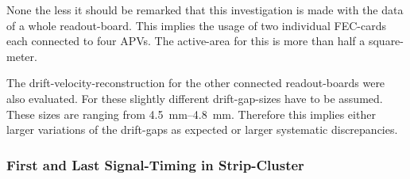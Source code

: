 \documentclass[
twoside,            %
BCOR1.4cm,          %
10pt,               %
headings=normal,    %
headsepline,        %
clearplainpage,		%
final,              %
div=14,
open=right,
bibliography=toc
]{scrreprt}
\begin{document}
None the less it should be remarked that this investigation is made with the data of a whole readout-board.
This implies the usage of two individual FEC-cards each connected to four APVs.
The active-area for this is more than half a square-meter. 

The drift-velocity-reconstruction for the other connected readout-boards were also evaluated.
For these slightly different drift-gap-sizes have to be assumed.
These sizes are ranging from \SIrange{4.5}{4.8}{mm}.
Therefore this implies either larger variations of the drift-gaps as expected or larger systematic discrepancies.

\subsubsection{First and Last Signal-Timing in Strip-Cluster}
\end{document}
